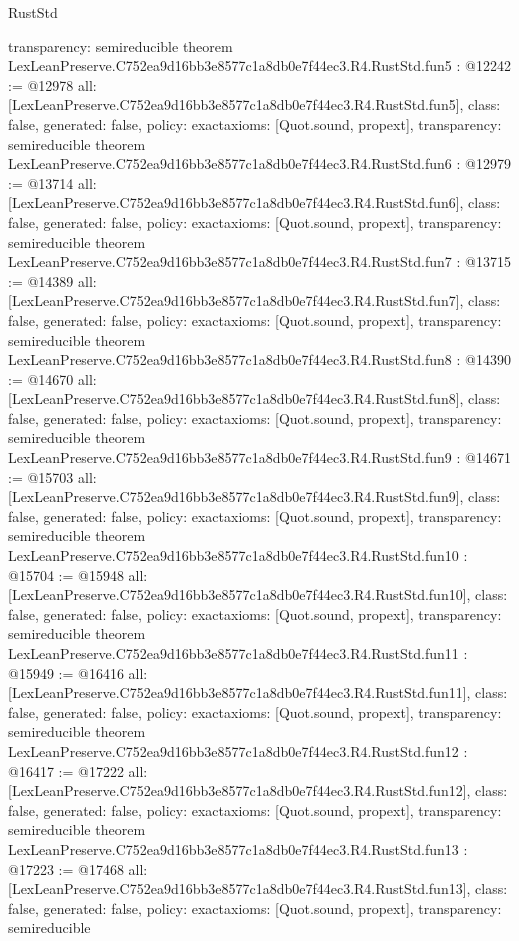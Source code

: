 \begin{lexlean}{RustStd}
\begin{coremodule}
{  transparency: semireducible
}
theorem LexLeanPreserve.C752ea9d16bb3e8577c1a8db0e7f44ec3.R4.RustStd.fun5 : @12242 := @12978 {
  all: [LexLeanPreserve.C752ea9d16bb3e8577c1a8db0e7f44ec3.R4.RustStd.fun5],
  class: false,
  generated: false,
  policy: exact{axioms: [Quot.sound, propext]},
  transparency: semireducible
}
theorem LexLeanPreserve.C752ea9d16bb3e8577c1a8db0e7f44ec3.R4.RustStd.fun6 : @12979 := @13714 {
  all: [LexLeanPreserve.C752ea9d16bb3e8577c1a8db0e7f44ec3.R4.RustStd.fun6],
  class: false,
  generated: false,
  policy: exact{axioms: [Quot.sound, propext]},
  transparency: semireducible
}
theorem LexLeanPreserve.C752ea9d16bb3e8577c1a8db0e7f44ec3.R4.RustStd.fun7 : @13715 := @14389 {
  all: [LexLeanPreserve.C752ea9d16bb3e8577c1a8db0e7f44ec3.R4.RustStd.fun7],
  class: false,
  generated: false,
  policy: exact{axioms: [Quot.sound, propext]},
  transparency: semireducible
}
theorem LexLeanPreserve.C752ea9d16bb3e8577c1a8db0e7f44ec3.R4.RustStd.fun8 : @14390 := @14670 {
  all: [LexLeanPreserve.C752ea9d16bb3e8577c1a8db0e7f44ec3.R4.RustStd.fun8],
  class: false,
  generated: false,
  policy: exact{axioms: [Quot.sound, propext]},
  transparency: semireducible
}
theorem LexLeanPreserve.C752ea9d16bb3e8577c1a8db0e7f44ec3.R4.RustStd.fun9 : @14671 := @15703 {
  all: [LexLeanPreserve.C752ea9d16bb3e8577c1a8db0e7f44ec3.R4.RustStd.fun9],
  class: false,
  generated: false,
  policy: exact{axioms: [Quot.sound, propext]},
  transparency: semireducible
}
theorem LexLeanPreserve.C752ea9d16bb3e8577c1a8db0e7f44ec3.R4.RustStd.fun10 : @15704 := @15948 {
  all: [LexLeanPreserve.C752ea9d16bb3e8577c1a8db0e7f44ec3.R4.RustStd.fun10],
  class: false,
  generated: false,
  policy: exact{axioms: [Quot.sound, propext]},
  transparency: semireducible
}
theorem LexLeanPreserve.C752ea9d16bb3e8577c1a8db0e7f44ec3.R4.RustStd.fun11 : @15949 := @16416 {
  all: [LexLeanPreserve.C752ea9d16bb3e8577c1a8db0e7f44ec3.R4.RustStd.fun11],
  class: false,
  generated: false,
  policy: exact{axioms: [Quot.sound, propext]},
  transparency: semireducible
}
theorem LexLeanPreserve.C752ea9d16bb3e8577c1a8db0e7f44ec3.R4.RustStd.fun12 : @16417 := @17222 {
  all: [LexLeanPreserve.C752ea9d16bb3e8577c1a8db0e7f44ec3.R4.RustStd.fun12],
  class: false,
  generated: false,
  policy: exact{axioms: [Quot.sound, propext]},
  transparency: semireducible
}
theorem LexLeanPreserve.C752ea9d16bb3e8577c1a8db0e7f44ec3.R4.RustStd.fun13 : @17223 := @17468 {
  all: [LexLeanPreserve.C752ea9d16bb3e8577c1a8db0e7f44ec3.R4.RustStd.fun13],
  class: false,
  generated: false,
  policy: exact{axioms: [Quot.sound, propext]},
  transparency: semireducible
}
\end{coremodule}
\end{lexlean}
